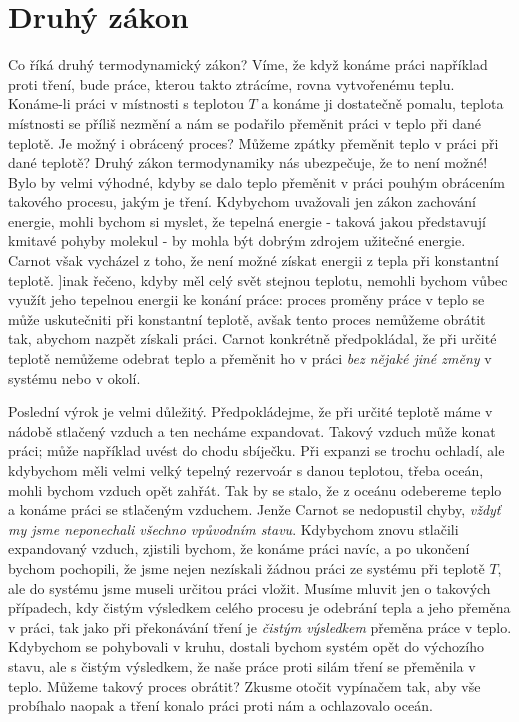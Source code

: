   \section{Druhý zákon}\label{fyz:IchapXLIVsecII}
    Co říká druhý termodynamický zákon? Víme, že když konáme práci například proti tření, bude
    práce, kterou takto ztrácíme, rovna vytvořenému teplu. Konáme-li práci v místnosti s teplotou
    \(T\) a konáme ji dostatečně pomalu, teplota místnosti se příliš nezmění a nám se podařilo
    přeměnit práci v teplo při dané teplotě. Je možný i obrácený proces? Můžeme zpátky přeměnit
    teplo v práci při dané teplotě? Druhý zákon termodynamiky nás ubezpečuje, že to není možné! Bylo
    by velmi výhodné, kdyby se dalo teplo přeměnit v práci pouhým obrácením takového procesu, jakým
    je tření. Kdybychom uvažovali jen zákon zachování energie, mohli bychom si myslet, že tepelná
    energie - taková jakou představují kmitavé pohyby molekul - by mohla být dobrým zdrojem užitečné
    energie. Carnot však vycházel z toho, že není možné získat energii z tepla při konstantní
    teplotě. ]inak řečeno, kdyby měl celý svět stejnou teplotu, nemohli bychom vůbec využít jeho
    tepelnou energii ke konání práce: proces proměny práce v teplo se může uskutečniti při
    konstantní teplotě, avšak tento proces nemůžeme obrátit tak, abychom nazpět získali práci.
    Carnot konkrétně předpokládal, že při určité teplotě nemůžeme odebrat teplo a přeměnit ho v
    práci \emph{bez nějaké jiné změny} v systému nebo v okolí.

    Poslední výrok je velmi důležitý. Předpokládejme, že při určité teplotě máme v nádobě stlačený
    vzduch a ten necháme expandovat. Takový vzduch může konat práci; může například uvést do chodu
    sbíječku. Při expanzi se trochu ochladí, ale kdybychom měli velmi velký tepelný rezervoár s
    danou teplotou, třeba oceán, mohli bychom vzduch opět zahřát. Tak by se stalo, že z oceánu
    odebereme teplo a konáme práci se stlačeným vzduchem. Jenže Carnot se nedopustil chyby,
    \emph{vždyť my jsme neponechali všechno vpůvodním stavu}. Kdybychom znovu stlačili expandovaný
    vzduch, zjistili bychom, že konáme práci navíc, a po ukončení bychom pochopili, že jsme nejen
    nezískali žádnou práci ze systému při teplotě \(T\), ale do systému jsme museli určitou práci
    vložit. Musíme mluvit jen o takových případech, kdy čistým výsledkem celého procesu je odebrání
    tepla a jeho přeměna v práci, tak jako při překonávání tření je \emph{čistým výsledkem} přeměna
    práce v teplo. Kdybychom se pohybovali v kruhu, dostali bychom systém opět do výchozího stavu,
    ale s čistým výsledkem, že naše práce proti silám tření se přeměnila v teplo. Můžeme takový
    proces obrátit? Zkusme otočit vypínačem tak, aby vše probíhalo naopak a tření konalo práci proti
    nám a ochlazovalo oceán.

